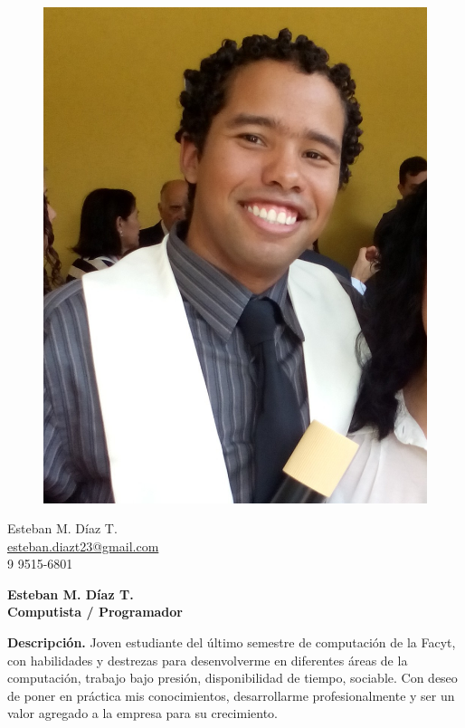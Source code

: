 \documentclass[a4paper,12pt,final]{memoir}
\newcommand{\Sep}{\vspace{1.5em}}
\newenvironment{AboutMe}
	{\ignorespaces\textbf{\color{RoyalBlue} Descripción.}}
	{\Sep\ignorespacesafterend}
\begin{document}
%
\begin{figure}
	\hfill
	\includegraphics[width=0.8\columnwidth]{foto.jpg}
	\vspace{-7cm}
\end{figure}

\begin{flushright}\small
	Esteban M. Díaz T. \\
	\tiny{\url{esteban.diazt23@gmail.com}}\\
	9 9515-6801 
\end{flushright}\normalsize
\framebreak


\Huge\bfseries {\color{RoyalBlue} Esteban M. Díaz T.} \\
\Large\bfseries  Computista / Programador \\

\normalsize\normalfont

\begin{AboutMe}
Joven estudiante del último semestre de computación de la Facyt,  con
 habilidades y destrezas para desenvolverme en diferentes áreas de la
computación, trabajo bajo presión, disponibilidad de tiempo, sociable. Con
deseo de poner en práctica mis conocimientos, desarrollarme profesionalmente y
ser un valor agregado a la empresa para su crecimiento.
\end{AboutMe}
\end{document}
